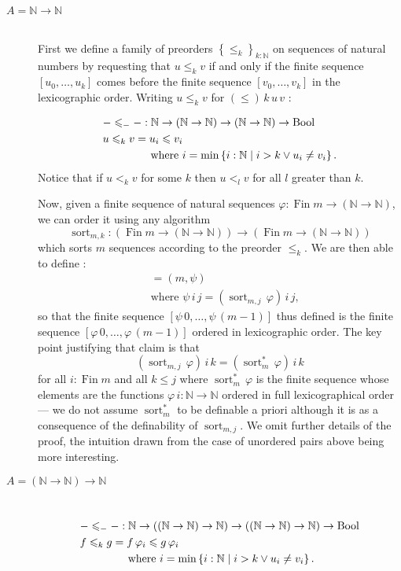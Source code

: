 \documentclass[envcountsame]{llncs}
\newcommand{\N}{\mathbb{N}}
\providecommand{\class}[1]{[#1]}
\providecommand{\set}  [1]{\left\{#1\right\}}
\DeclareMathOperator{\Bool}{Bool}
\DeclareMathOperator{\Fin}{Fin}
\DeclareMathOperator{\sort}{sort}
\begin{document}
\begin{description}
\item[$A=\N\to\N$] \hfill\\
First we define a family of preorders $\set{{\leq_k}}_{k:\N}$
on sequences of natural numbers by requesting that $u\leq_k v$
if and only if  the finite sequence $[u_0,\dots, u_k]$ comes before the finite sequence $[v_0,\dots, v_k]$ in the lexicographic order. Writing $u \leq_k v $ for $(\leq) \,k\,u\,v$ :


\begin{align*}
&{{-}\leq_{-}{-}} : \N\to (\N\to\N) \to (\N\to\N)\to \Bool\\
&{u\leq_k v} =  u_i\leq v_i \\
&\text{\phantom{$f\leq_n g =$} where }i =\min\set{i:\N\mid i>k\lor u_i\neq v_i}.
\end{align*}
Notice that if $u<_k v$ for some $k$ then $u<_l v$ for all $l$ greater than $k$.

Now, given a finite sequence of natural sequences $\varphi:\Fin m\to (\N\to\N)$, we can order it using any algorithm
\[\sort_{m,k} :(\Fin m \to (\N\to\N)) \to (\Fin m \to (\N\to\N))\]
which sorts $m$ sequences according to the preorder $\leq_k$.
We are then able to define :\begin{align*}
\class{(m,\varphi)} &= (m,\psi)\\
&\text{where $\psi\,i\,j = (\sort_{m,j}\,\varphi)\,i\,j$,}
\end{align*}
so that the finite sequence  $[\psi\,0,\dots,\psi\,(m-1)]$ thus defined is the finite sequence $[\varphi\,0,\dots,\varphi\,(m-1)]$ ordered in lexicographic order. The key point justifying that claim is that
\begin{equation}\label{eq:ms:order}
(\sort_{m, j}\,\varphi)\,i\,k=(\sort^\ast_{m}\,\varphi)\,i\,k
\end{equation}
for all $i:\Fin m$ and all $k\leq j$ where $\sort^\ast_m\,\varphi$ is the finite sequence whose elements are the functions $\varphi\,i:\N\to\N$ ordered in full lexicographical order --- we do not assume $\sort^\ast_m$ to be definable a priori although it is as a consequence of the definability of $\sort_{m,j}$.
We omit further details of the proof,  the intuition drawn from the case of unordered pairs above being more interesting.


\bigskip
\item[$A=(\N\to\N)\to\N$] \hfill\\
\begin{align*}
&{{-}\leq_{-}{-}} : \N\to ((\N\to\N)\to\N) \to ((\N\to\N)\to\N)\to \Bool\\
&{f\leq_k g} =  f\,\varphi_i\leq g\,\varphi_i \\
&\text{\phantom{$f\leq_n g =$} where }i =\min\set{i:\N\mid i>k\lor u_i\neq v_i}.
\end{align*}


\end{description}
\end{document}
